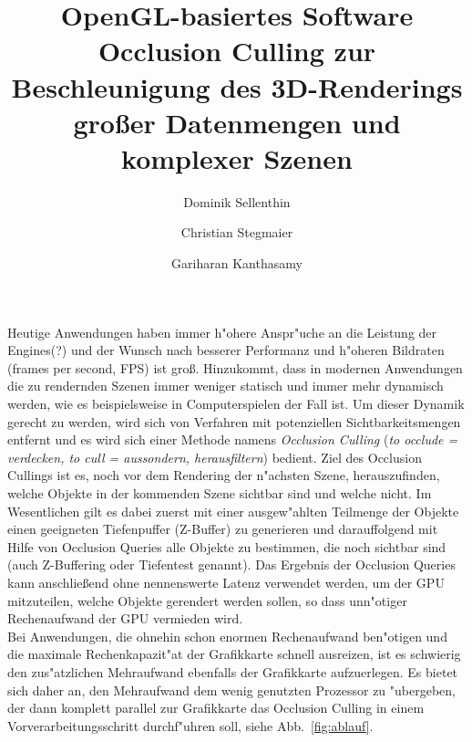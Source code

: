 \documentclass[journal]{vgtc}
\author{Dominik Sellenthin \and Christian Stegmaier \and Gariharan Kanthasamy}
\title{OpenGL-basiertes Software Occlusion Culling zur Beschleunigung des 3D-Renderings gro{\ss}er Datenmengen und komplexer Szenen}
\begin{document}


\maketitle

Heutige Anwendungen haben immer h"ohere Anspr"uche an die Leistung der Engines(?) und der Wunsch nach besserer Performanz und h"oheren Bildraten (frames per second, FPS) ist gro{\ss}.
Hinzukommt, dass in modernen Anwendungen die zu rendernden Szenen immer weniger statisch und immer mehr dynamisch werden, wie es beispielsweise in Computerspielen der Fall ist.
Um dieser Dynamik gerecht zu werden, wird sich von Verfahren mit potenziellen Sichtbarkeitsmengen entfernt \cite{MSOC} und es wird sich einer Methode namens \textit{Occlusion Culling} (\textit{to occlude = verdecken, to cull = aussondern, herausfiltern}) bedient.
Ziel des Occlusion Cullings ist es, noch vor dem Rendering der n"achsten Szene, herauszufinden, welche Objekte in der kommenden Szene sichtbar sind und welche nicht.
Im Wesentlichen gilt es dabei zuerst mit einer ausgew"ahlten Teilmenge der Objekte einen geeigneten Tiefenpuffer (Z-Buffer) zu generieren und darauffolgend mit Hilfe von Occlusion Queries alle Objekte zu bestimmen, die noch sichtbar sind (auch Z-Buffering oder Tiefentest genannt).
Das Ergebnis der Occlusion Queries kann anschlie{\ss}end ohne nennenswerte Latenz verwendet werden, um der GPU mitzuteilen, welche Objekte gerendert werden sollen, so dass unn"otiger Rechenaufwand der GPU vermieden wird.\\

Bei Anwendungen, die ohnehin schon enormen Rechenaufwand ben"otigen und die maximale Rechenkapazit"at der Grafikkarte schnell ausreizen, ist es schwierig den zus"atzlichen Mehraufwand ebenfalls der Grafikkarte aufzuerlegen.
Es bietet sich daher an, den Mehraufwand dem wenig genutzten Prozessor zu "ubergeben, der dann komplett parallel zur Grafikkarte das Occlusion Culling in einem Vorverarbeitungsschritt durchf"uhren soll, siehe Abb.\ \ref{fig:ablauf}.
\end{document}
